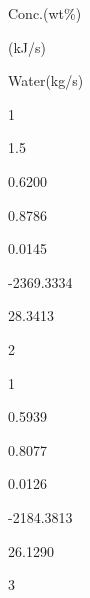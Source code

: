 \documentclass[a4paper,portrait,12pt]{article}
\begin{document}
\begin{flushleft}
Conc.(wt\%)
\end{flushleft}





\begin{flushleft}
(kJ/s)
\end{flushleft}





\begin{flushleft}
Water(kg/s)
\end{flushleft}





1





1.5





0.6200





0.8786





0.0145





-2369.3334





28.3413





2





1





0.5939





0.8077





0.0126





-2184.3813





26.1290





3
\end{document}
